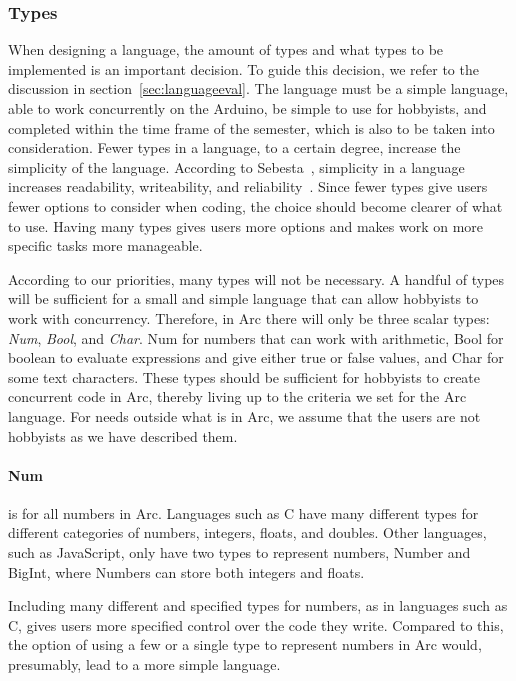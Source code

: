 \subsubsection{Types}
When designing a language, the amount of types and what types to be implemented is an important decision. To guide this decision, we refer to the discussion in section~\ref{sec:languageeval}. The language must be a simple language, able to work concurrently on the Arduino, be simple to use for hobbyists, and completed within the time frame of the semester, which is also to be taken into consideration. Fewer types in a language, to a certain degree, increase the simplicity of the language. According to Sebesta~\cite{Sebesta2016}, simplicity in a language increases readability, writeability, and reliability~\cite{Sebesta2016}. Since fewer types give users fewer options to consider when coding, the choice should become clearer of what to use. Having many types gives users more options and makes work on more specific tasks more manageable.

According to our priorities, many types will not be necessary. A handful of types will be sufficient for a small and simple language that can allow hobbyists to work with concurrency. Therefore, in Arc there will only be three scalar types: \textit{Num}, \textit{Bool}, and \textit{Char}. Num for numbers that can work with arithmetic, Bool for boolean to evaluate expressions and give either true or false values, and Char for some text characters. These types should be sufficient for hobbyists to create concurrent code in Arc, thereby living up to the criteria we set for the Arc language. For needs outside what is in Arc, we assume that the users are not hobbyists as we have described them.


\paragraph{Num} is for all numbers in Arc. Languages such as C have many different types for different categories of numbers, integers, floats, and doubles. Other languages, such as JavaScript, only have two types to represent numbers, Number and BigInt, where Numbers can store both integers and floats.

Including many different and specified types for numbers, as in languages such as C, gives users more specified control over the code they write. Compared to this, the option of using a few or a single type to represent numbers in Arc would, presumably, lead to a more simple language.

